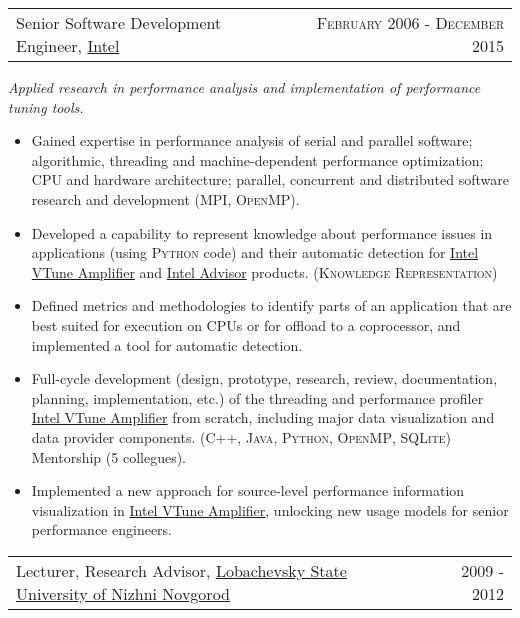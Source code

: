 \documentclass{article}
\makeatletter
\newcommand{\whatwherewhen}[3]{
\noindent\begin{tabular*}{\columnwidth}{@{}@{\extracolsep{\fill}}lr@{}}
#1, #2 & \textsc{#3}
\end{tabular*}}
\newcommand{\smallvskip}{\vskip2mm}
\makeatother
\begin{document}
\smallvskip
\whatwherewhen{Senior Software Development Engineer}{\href{http://intel.com}{Intel}}{February 2006 - December 2015}

\textit{Applied research in performance analysis and implementation of performance tuning tools.}

\begin{itemize}

\item Gained expertise in performance analysis of serial and parallel software; algorithmic, threading and machine-dependent performance optimization; CPU and hardware architecture; parallel, concurrent and distributed software research and development (\textsc{MPI}, \textsc{OpenMP}).

\item Developed a capability to represent knowledge about performance issues in applications (using \textsc{Python} code) and their automatic detection for \href{http://software.intel.com/en-us/intel-vtune-amplifier-xe}{Intel VTune Amplifier} and \href{https://software.intel.com/en-us/intel-advisor-xe}{Intel Advisor} products. (\textsc{Knowledge Representation})

\item Defined metrics and methodologies to identify parts of an application that are best suited for execution on CPUs or for offload to a coprocessor, and implemented a tool for automatic detection.

\item Full-cycle development (design, prototype, research, review, documentation, planning, implementation, etc.) of the threading and performance profiler \href{http://software.intel.com/en-us/intel-vtune-amplifier-xe}{Intel VTune Amplifier} from scratch, including major data visualization and data provider components. (\textsc{C++}, \textsc{Java}, \textsc{Python}, \textsc{OpenMP}, \textsc{SQLite}) Mentorship (5 collegues).

\item Implemented a new approach for source-level performance information visualization in \href{http://software.intel.com/en-us/intel-vtune-amplifier-xe}{Intel VTune Amplifier}, unlocking new usage models for senior performance engineers.

\end{itemize}


\smallvskip
\whatwherewhen{Lecturer, Research Advisor}{\href{http://unn.ru/eng}{Lobachevsky State University of Nizhni Novgorod}}{2009 - 2012}
\end{document}
